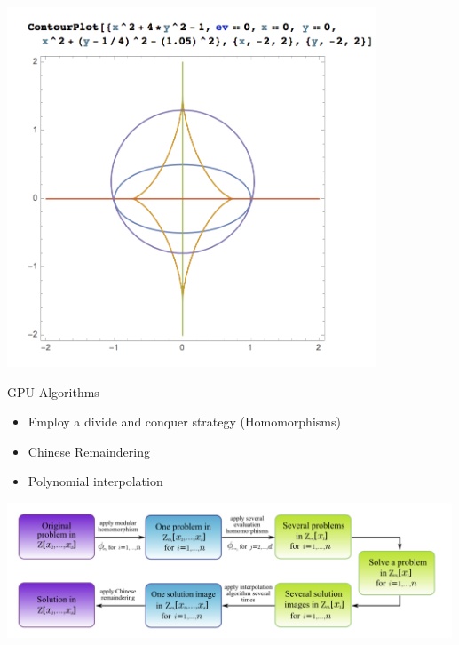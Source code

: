 \documentclass{beamer}
\begin{document}
	
	\begin{frame}
		\centering
		\includegraphics[width=0.825\textwidth]{../Code/Images/Ellipse_structure.png}
	\end{frame}
	
	\begin{frame}
		\begin{center}
			\Huge GPU Algorithms
		\end{center}
		\begin{itemize}
			\item Employ a divide and conquer strategy (Homomorphisms)
			\item Chinese Remaindering
			\item Polynomial interpolation
		\end{itemize}
	\end{frame}
	
	
	\begin{frame}
		\centering
		\vspace{0.4in}
		\includegraphics[width=0.995\textwidth]{../Code/Images/diagram_homomorphisms.png}
	\end{frame}
	
\end{document}
